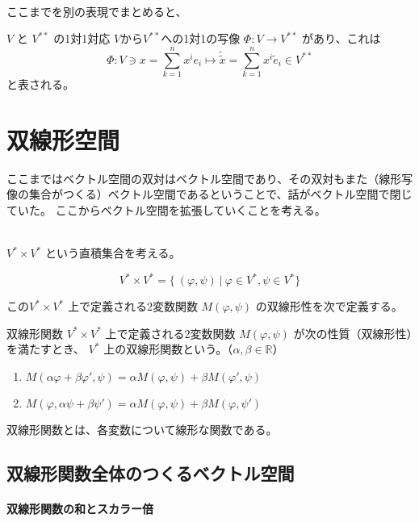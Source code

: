 \documentclass[uplatex,a4j,12pt,dvipdfmx]{jsarticle}
\begin{document}
\ \\

ここまでを別の表現でまとめると、

\begin{itembox}[l]{$V$ と $V^{**}$ の1対1対応}
	$V$から$V^{**}$への1対1の写像 $\Phi : V \to V^{**}$
	があり、これは
	$$
		\Phi: V \ni x = \sum_{k=1}^{n} x^{i} e_{i} \mapsto \tilde{\tilde{x}} = \sum_{k=1}^{n} x^{i} \tilde{e}_{i} \in V^{**}
	$$
	と表される。
\end{itembox}



\section{双線形空間}

ここまではベクトル空間の双対はベクトル空間であり、その双対もまた（線形写像の集合がつくる）ベクトル空間であるということで、話がベクトル空間で閉じていた。
ここからベクトル空間を拡張していくことを考える。

\ \\

$V^{*} \times V^{*}$ という直積集合を考える。

$$
	V^{*} \times V^{*}
	=
	\{
	\ (\varphi, \psi ) \ | \ \varphi \in V^{*}, \psi \in V^{*}
	\}
$$

この$V^{*} \times V^{*}$ 上で定義される2変数関数
$M(\varphi,\psi)$ の双線形性を次で定義する。


\begin{itembox}[l]{双線形関数}
	$V^{*} \times V^{*}$ 上で定義される2変数関数
	$M(\varphi,\psi)$
	が次の性質（双線形性）を満たすとき、
	$V^{*}$ 上の双線形関数という。（$\alpha, \beta \in \mathbb{R}$）
	\begin{enumerate}
		\item $M(\alpha \varphi + \beta \varphi', \psi) = \alpha M( \varphi, \psi) + \beta M( \varphi', \psi)$
		\item $M(\varphi, \alpha \psi + \beta \psi') = \alpha M( \varphi, \psi) + \beta M( \varphi, \psi')$
	\end{enumerate}
\end{itembox}

双線形関数とは、各変数について線形な関数である。

\subsection{双線形関数全体のつくるベクトル空間}

\paragraph{双線形関数の和とスカラー倍}
\end{document}
